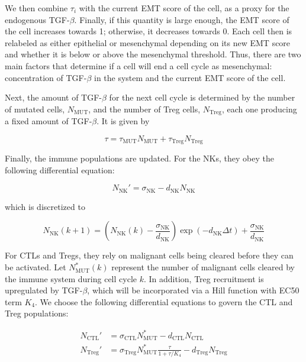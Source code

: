 \documentclass[11pt, a4paper, preprint]{article}
\begin{document}
We then combine $\tau_i$ with the current EMT score of the cell, as a proxy for the endogenous TGF-$\beta$.
Finally, if this quantity is large enough, the EMT score of the cell increases towards 1; otherwise, it decreases towards 0.
Each cell then is relabeled as either epithelial or mesenchymal depending on its new EMT score and whether it is below or above the mesenchymal threshold.
Thus, there are two main factors that determine if a cell will end a cell cycle as mesenchymal: concentration of TGF-$\beta$ in the system and the current EMT score of the cell.

Next, the amount of TGF-$\beta$ for the next cell cycle is determined by the number of mutated cells, $N_{\text{MUT}}$, and the number of Treg cells, $N_{\text{Treg}}$, each one producing a fixed amount of TGF-$\beta$. It is given by

\begin{equation}\tag{2.6}
\tau = \tau_{\text{MUT}}N_{\text{MUT}} + \tau_{\text{Treg}}N_{\text{Treg}}
\end{equation}


Finally, the immune populations are updated.
For the NKs, they obey the following differential equation:
 
\begin{equation}\tag{2.7}
N_{\text{NK}}' = \sigma_{\text{NK}} - d_{\text{NK}}N_{\text{NK}}
\end{equation}

which is discretized to
 
 \begin{equation}\tag{2.8}
N_{\text{NK}}(k+1) = \left (N_{\text{NK}}(k)-\frac{\sigma_{\text{NK}}}{d_{\text{NK}}} \right )\exp(-d_{\text{NK}}\Delta t)+\frac{\sigma_{\text{NK}}}{d_{\text{NK}}}
\end{equation}

For CTLs and Tregs, they rely on malignant cells being cleared before they can be activated.
Let $N_{\text{MUT}}^*(k)$ represent the number of malignant cells cleared by the immune system during cell cycle $k$.
In addition, Treg recruitment is upregulated by TGF-$\beta$, which will be incorporated via a Hill function with EC50 term $K_4$.
We choose the following differential equations to govern the CTL and Treg populations:

\begin{equation}\tag{2.9}
\begin{split}
N_\text{CTL}' & = \sigma_{\text{CTL}}N_{\text{MUT}}^* - d_{\text{CTL}}N_\text{CTL} \\
N_\text{Treg}' & = \sigma_{\text{Treg}}N_{\text{MUT}}^* \frac{\tau}{1+\tau/K_4}- d_{\text{Treg}}N_\text{Treg}
\end{split}
\end{equation}
\end{document}
